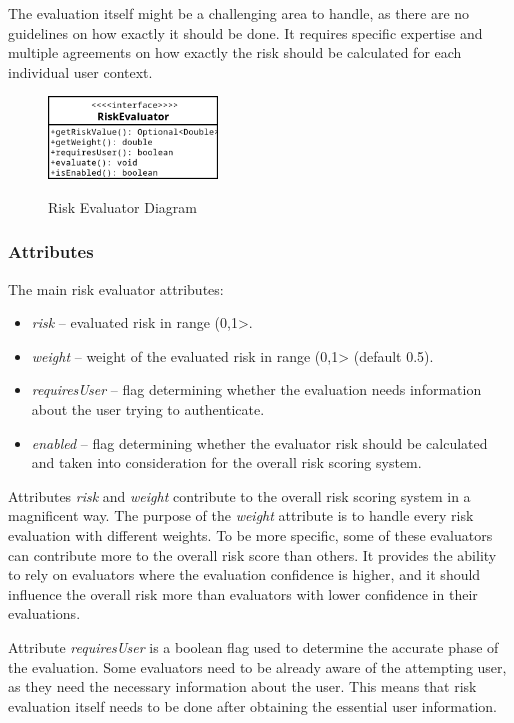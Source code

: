 The evaluation itself might be a challenging area to handle, as there are no guidelines on how exactly it should be done.
It requires specific expertise and multiple agreements on how exactly the risk should be calculated for each individual user context.

\begin{figure}[htbp]
  \centering
  \includegraphics[width=0.4\textwidth]{img/sections/5-design/riskEvaluator.png}
  \label{fig:design-user-evaluator-diagram}
  \caption{Risk Evaluator Diagram}
\end{figure}

\subsubsection{Attributes}
The main risk evaluator attributes:

\begin{itemize}
    \item \textit{risk} -- evaluated risk in range (0,1>.
    \item \textit{weight} -- weight of the evaluated risk in range (0,1> (default 0.5).
    \item \textit{requiresUser} -- flag determining whether the evaluation needs information about the user trying to authenticate. 
    \item \textit{enabled} -- flag determining whether the evaluator risk should be calculated and taken into consideration for the overall risk scoring system. 
\end{itemize}

Attributes \textit{risk} and \textit{weight} contribute to the overall risk scoring system in a magnificent way.
The purpose of the \textit{weight} attribute is to handle every risk evaluation with different weights.
To be more specific, some of these evaluators can contribute more to the overall risk score than others.
It provides the ability to rely on evaluators where the evaluation confidence is higher, and it should influence the overall risk more than evaluators with lower confidence in their evaluations.

Attribute \textit{requiresUser} is a boolean flag used to determine the accurate phase of the evaluation.
Some evaluators need to be already aware of the attempting user, as they need the necessary information about the user.
This means that risk evaluation itself needs to be done after obtaining the essential user information.

